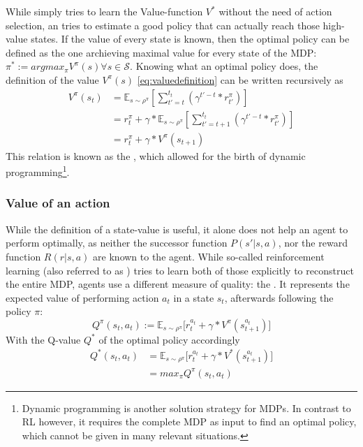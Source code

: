 While  simply tries to learn the Value-function $V^*$ without the need of action selection, an  tries to estimate a good policy that can actually reach those high-value states. If the value of every state is known, then the optimal policy can be defined as the one archieving maximal value for every state of the MDP: \mbox{$\pi^* := argmax_\pi V^\pi(s) \forall s \in \mathcal{S}$}. Knowing what an optimal policy does, the definition of the value $V^\pi(s)$ \ref{eq:valuedefinition} can be written recursively as
\begin{align}
	V^\pi(s_t) &= \mathds{E}_{s\sim\rho^\pi} \left[  \sum_{t'=t}^{t_t} ( \gamma^{t'-t} * r^\pi_{t'} ) \right]  \nonumber \\
	&= r_t^\pi + \gamma * \mathds{E}_{s\sim\rho^\pi} \left[  \sum_{t'=t+1}^{t_t} ( \gamma^{t'-t} * r^\pi_{t'} ) \right]  \nonumber \\
	&= r_t^\pi + \gamma * V^\pi(s_{t+1}) \label{statebellman}
\end{align}
This relation is known as the , which allowed for the birth of dynamic programming\footnote{Dynamic programming is another solution strategy for MDPs. In contrast to RL however, it requires the complete MDP as input to find an optimal policy, which cannot be given in many relevant situations.}.

\subsubsection{Value of an action}
While the definition of a state-value is useful, it alone does not help an agent to perform optimally, as neither the successor function $P(s'|s,a)$, nor the reward function $R(r|s,a)$ are known to the agent. While so-called  reinforcement learning (also referred to as ) tries to learn both of those explicitly to reconstruct the entire MDP,  agents use a different measure of quality: the . It represents the expected value of performing action $a_t$ in a state $s_t$, afterwards following the policy $\pi$:
\begin{equation} \label{eq:1.2}
	Q^\pi(s_t,a_t) :=  \mathds{E}_{s\sim\rho^\pi} \big[ r_t^{a_t} + \gamma * V^\pi(s_{t+1}^{a_t}) \big]
\end{equation}
With the Q-value $Q^*$ of the optimal policy accordingly 
\begin{align*}
	Q^*(s_t,a_t) &=  \mathds{E}_{s\sim\rho^\pi} \big[ r_t^{a_t} + \gamma * V^*(s_{t+1}^{a_t}) \big] \\
	&= max_\pi Q^\pi(s_t,a_t)
\end{align*}

